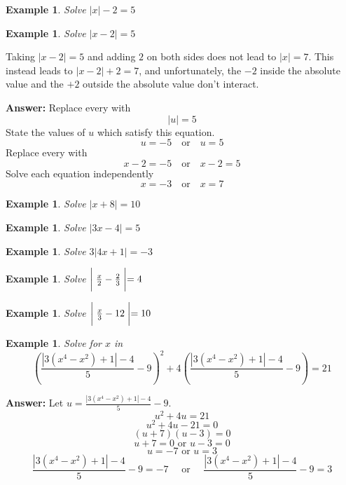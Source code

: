\documentclass[twoside]{tufte-handout}
\newcounter{ekcounter}%
\theoremstyle{ekimcustom}
\newtheorem{exm}[ekcounter]{Example}
\begin{document}

\begin{exm}{}Solve  $|x|-2= 5$
\end{exm}\vskip10pt

\begin{exm}{}Solve  $|x-2|= 5$
\end{exm}
\begin{bwarning}{}{}
Taking $|x -2| =5$ and adding $2$ on both sides does not lead to $|x|=7$. This instead leads to $|x -2|+2 = 7$, and unfortunately, the $-2$ inside the absolute value and the $+2$ outside the absolute value don't interact.
\end{bwarning}
{\bf Answer:} Replace every  with 
\[ |u| = 5 \]
State the values of $u$ which satisfy this equation.
\[ u= -5 \quad\text{or}\quad u=5\]
Replace every  with 
\[ x-2= -5 \quad\text{or}\quad x-2=5\]
Solve each equation independently
\[ x= -3 \quad\text{or}\quad x=7\]

\vskip10pt


\everymath{\displaystyle}

\begin{exm}{}Solve  $|x+8|= 10$
\end{exm}\vskip10pt

\begin{exm}{}Solve  $|3x-4|=5$
\end{exm}\vskip10pt


\everymath{\displaystyle}
\begin{exm}{}Solve  $3|4x+1|= -3$
\end{exm}\vskip10pt

\begin{exm}{}Solve  $\biggm|\frac{x}{2}-\frac{2}{3}\biggm|=4$
\end{exm}\vskip10pt

\begin{exm}{}Solve  $\biggm|\frac{x}{3}-12\biggm|= 10$
\end{exm}\vskip10pt



\begin{exm} Solve for $x$ in
\[
\left(\frac{|3(x^4-x^2)+1|-4}{5}-9\right)^2+4\left(\frac{|3(x^4-x^2)+1|-4}{5}-9\right)=21\]
\end{exm}
{\bf Answer:}
 Let $u=\frac{|3(x^4-x^2)+1|-4}{5}-9$.
 \[ u^2+4u=21\]
 \[u^2+4u-21=0\]
 \[(u+7)(u-3)=0\]
 \[u+7=0 \text{ or } u-3=0\]
 \[u=-7 \text{ or } u=3\]
 \[\frac{|3(x^4-x^2)+1|-4}{5}-9=-7 \quad\text{ or }\quad \frac{|3(x^4-x^2)+1|-4}{5}-9=3\]
\end{document}

